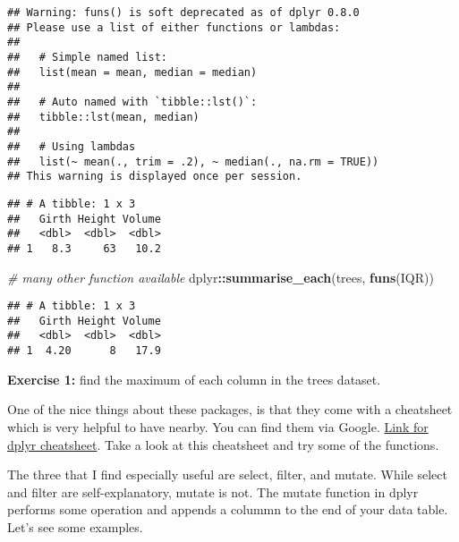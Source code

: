 \documentclass[]{article}
\newenvironment{Shaded}{\begin{snugshade}}{\end{snugshade}}
\newcommand{\CommentTok}[1]{\textcolor[rgb]{0.56,0.35,0.01}{\textit{#1}}}
\newcommand{\DataTypeTok}[1]{\textcolor[rgb]{0.13,0.29,0.53}{#1}}
\newcommand{\FloatTok}[1]{\textcolor[rgb]{0.00,0.00,0.81}{#1}}
\newcommand{\KeywordTok}[1]{\textcolor[rgb]{0.13,0.29,0.53}{\textbf{#1}}}
\newcommand{\NormalTok}[1]{#1}
\newcommand{\OperatorTok}[1]{\textcolor[rgb]{0.81,0.36,0.00}{\textbf{#1}}}
\newcommand{\StringTok}[1]{\textcolor[rgb]{0.31,0.60,0.02}{#1}}
\begin{document}
\begin{verbatim}
## Warning: funs() is soft deprecated as of dplyr 0.8.0
## Please use a list of either functions or lambdas: 
## 
##   # Simple named list: 
##   list(mean = mean, median = median)
## 
##   # Auto named with `tibble::lst()`: 
##   tibble::lst(mean, median)
## 
##   # Using lambdas
##   list(~ mean(., trim = .2), ~ median(., na.rm = TRUE))
## This warning is displayed once per session.
\end{verbatim}

\begin{verbatim}
## # A tibble: 1 x 3
##   Girth Height Volume
##   <dbl>  <dbl>  <dbl>
## 1   8.3     63   10.2
\end{verbatim}

\begin{Shaded}
\begin{Highlighting}[]
\CommentTok{# many other function available}
\NormalTok{dplyr}\OperatorTok{::}\KeywordTok{summarise_each}\NormalTok{(trees, }\KeywordTok{funs}\NormalTok{(IQR))}
\end{Highlighting}
\end{Shaded}

\begin{verbatim}
## # A tibble: 1 x 3
##   Girth Height Volume
##   <dbl>  <dbl>  <dbl>
## 1  4.20      8   17.9
\end{verbatim}

\textbf{Exercise 1:} find the maximum of each column in the trees
dataset.

One of the nice things about these packages, is that they come with a
cheatsheet which is very helpful to have nearby. You can find them via
Google.
\href{https://rstudio.com/wp-content/uploads/2015/02/data-wrangling-cheatsheet.pdf}{Link
for dplyr cheatsheet}. Take a look at this cheatsheet and try some of
the functions.

The three that I find especially useful are select, filter, and mutate.
While select and filter are self-explanatory, mutate is not. The mutate
function in dplyr performs some operation and appends a colummn to the
end of your data table. Let's see some examples.

\begin{Shaded}
\end{Shaded}
\end{document}
